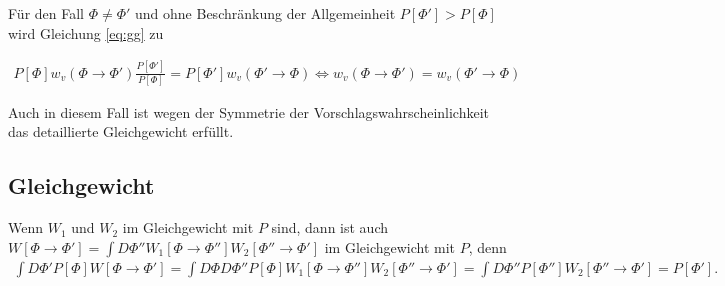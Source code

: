 \documentclass[10pt,a4paper]{article}
\begin{document}
Für den Fall $\Phi \neq \Phi'$ und ohne Beschränkung der Allgemeinheit $P[\Phi']>P[\Phi]$ wird Gleichung \ref{eq:gg} zu

\begin{align*}
		P[\Phi] w_v(\Phi\to\Phi') \frac{P[\Phi']}{P[\Phi]} = P[\Phi'] w_v(\Phi'\to\Phi)
		\Leftrightarrow w_v(\Phi\to\Phi')=w_v(\Phi'\to\Phi)
\end{align*}

Auch in diesem Fall ist wegen der Symmetrie der Vorschlagswahrscheinlichkeit das detaillierte Gleichgewicht erfüllt.

\subsection{Gleichgewicht}

Wenn $W_1$ und $W_2$ im Gleichgewicht mit $P$ sind, dann ist auch\\
 $W[\Phi\to \Phi']=\int D\Phi'' W_1[\Phi\to \Phi''] W_2[\Phi''\to\Phi']$
im Gleichgewicht mit $P$, denn
\begin{align*}
\int D\Phi'P[\Phi] W[\Phi\to \Phi'] = \int D\Phi D\Phi'' P[\Phi] W_1[\Phi\to \Phi''] W_2[\Phi''\to\Phi'] = \int D\Phi'' P[\Phi''] W_2[\Phi''\to\Phi'] = P[\Phi'].
\end{align*}
\end{document}
